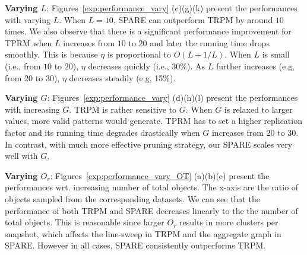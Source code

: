 \textbf{Varying $L$}: Figures~\ref{exp:performance_vary} (c)(g)(k) present the performances with varying $L$. When $L=10$, SPARE can outperform TRPM by around $10$ times. We also observe that there is a significant performance improvement for TPRM when $L$ increases from $10$ to $20$ and later the running time drops smoothly. 
This is because $\eta$ is proportional to $O(L + 1/L)$. When $L$ is small (i.e., from $10$ to $20$),
$\eta$ decreases quickly (i.e., 30\%). As $L$ further increases (e.g, from $20$ to $30$),
$\eta$ decreases steadily (e.g, 15\%).



\textbf{Varying $G$}: Figures~\ref{exp:performance_vary} (d)(h)(l) present the performances with increasing $G$.  TRPM is rather sensitive to $G$. When $G$ is relaxed to larger values, more valid patterns would generate. TPRM has to set a higher replication factor and its running time degrades drastically when $G$ increases from $20$ to $30$. In contrast, with much more effective pruning strategy, our SPARE scales very well with $G$.

\textbf{Varying $O_r$}: Figures~\ref{exp:performance_vary_OT} (a)(b)(c) present 
the performances wrt. increasing number of total objects. The x-axis are the ratio
of objects sampled from the corresponding datasets. We can see that the performance of
both TRPM and SPARE decreases linearly to the the number of total objects. This
is reasonable since larger $O_r$ results in more clusters per snapshot, which affects
the line-sweep in TRPM and the aggregate graph in SPARE. However in all cases, SPARE
consistently outperforms TRPM.


